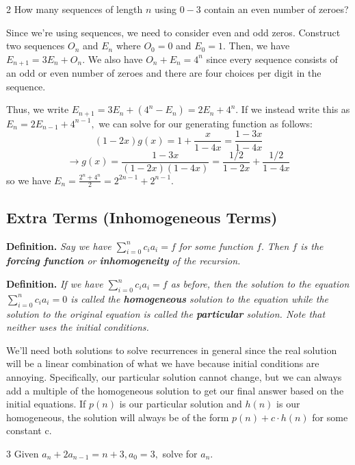 \begin{problem}2
    How many sequences of length $n$ using $0-3$ contain an even number of zeroes?
\end{problem}

\begin{solution}
    Since we're using sequences, we need to consider even and odd zeros. Construct two sequences $O_n$ and $E_n$ where $O_0=0$ and $E_0=1.$ Then, we have $E_{n+1}=3E_n+O_n.$ We also have $O_n+E_n=4^n$ since every sequence consists of an odd or even number of zeroes and there are four choices per digit in the sequence.

    Thus, we write $E_{n+1}=3E_n+(4^n-E_n)=2E_n+4^n.$ If we instead write this as $E_n=2E_{n-1}+4^{n-1},$ we can solve for our generating function as follows: $$(1-2x)g(x)=1+\frac{x}{1-4x}=\frac{1-3x}{1-4x}$$
$$\rightarrow g(x)=\frac{1-3x}{(1-2x)(1-4x)}=\frac{1/2}{1-2x}+\frac{1/2}{1-4x}$$
so we have $E_n=\boxed{\frac{2^n+4^n}{2}}=2^{2n-1}+2^{n-1}.$ 
\end{solution}


\subsection{Extra Terms (Inhomogeneous Terms)}

\textbf{Definition.} \textit{Say we have $\sum_{i=0}^{n}c_ia_i=f$ for some function $f.$ Then $f$ is the \textbf{forcing function} or \textbf{inhomogeneity} of the recursion.}

\textbf{Definition.} \textit{If we have $\sum_{i=0}^{n}c_ia_i=f$ as before, then the solution to the equation $\sum_{i=0}^{n}c_ia_i=0$ is called the \textbf{homogeneous} solution to the equation while the solution to the original equation is called the \textbf{particular} solution. Note that neither uses the initial conditions.}

We'll need both solutions to solve recurrences in general since the real solution will be a linear combination of what we have because initial conditions are annoying. Specifically, our particular solution cannot change, but we can always add a multiple of the homogeneous solution to get our final answer based on the initial equations. If $p(n)$ is our particular solution and $h(n)$ is our homogeneous, the solution will always be of the form $p(n)+c\cdot h(n)$ for some constant c.

\begin{problem}3
    Given $a_n+2a_{n-1}=n+3, a_0=3,$ solve for $a_n.$
\end{problem}

